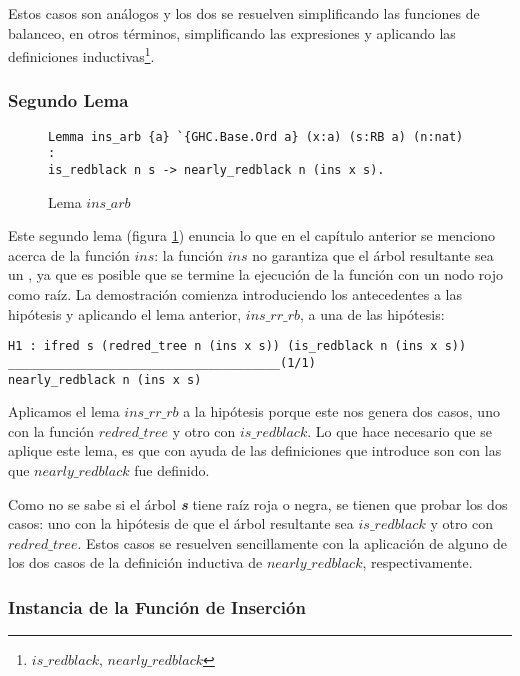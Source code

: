 Estos casos son análogos y los dos se resuelven simplificando las funciones de balanceo, en otros términos,
simplificando las expresiones y aplicando las definiciones inductivas\footnote{$is\_redblack$,
$nearly\_redblack$}.

\subsubsection{Segundo Lema}

\begin{figure}[!ht]
\centering
\captionsetup{justification=centering}
\begin{verbatim}
Lemma ins_arb {a} `{GHC.Base.Ord a} (x:a) (s:RB a) (n:nat) :
is_redblack n s -> nearly_redblack n (ins x s).
\end{verbatim}
\caption{Lema $ins\_arb$}
\label{lema_2}
\end{figure}

Este segundo lema (figura \ref{lema_2}) enuncia lo que en el cap\'itulo anterior se menciono acerca
de la funci\'on $ins$: la funci\'on $ins$ no garantiza que el \'arbol resultante sea un {\arn}, ya
que es posible que se termine la ejecuci\'on de la funci\'on con un nodo rojo como raíz. La
demostraci\'on comienza introduciendo los antecedentes a las hipótesis y aplicando el lema
anterior, $ins\_rr\_rb$, a una de las hip\'otesis:

\begin{verbatim}
H1 : ifred s (redred_tree n (ins x s)) (is_redblack n (ins x s))
______________________________________(1/1)
nearly_redblack n (ins x s)

\end{verbatim}

Aplicamos el lema $ins\_rr\_rb$ a la hip\'otesis porque este nos genera dos casos, uno con la funci\'on $redred\_tree$ y otro con $is\_redblack$. Lo que hace necesario
que se aplique este lema, es que con ayuda de las definiciones que introduce son con las que $nearly\_redblack$ fue definido.

Como no se sabe si el \'arbol \textit{\textbf{s}} tiene ra\'iz roja o negra, se tienen que probar los dos casos:
uno con la hipótesis de que el \'arbol resultante sea $is\_redblack$ y otro con $redred\_tree$.
Estos casos se resuelven sencillamente con la aplicación de alguno de los dos casos de la definici\'on
inductiva de $nearly\_redblack$, respectivamente.

\subsubsection{Instancia de la Funci\'on de Inserci\'on}

